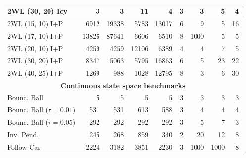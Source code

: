{\begin{tabular}{|l|rrrr|rrrr|}
\hline
2WL (30, 20) Icy & 3 & 3 & 11 & 4 & 3 & 3 & 5 & 4 \\
\hline
2WL (15, 10) I+P & 6912 & 19338 & 5783 & 13017 & 6 & 9 & 5 & 16 \\
2WL (17, 10) I+P & 13826 & 87641 & 6606 & 6510 & 8 & 1000 & 5 & 5 \\
2WL (20, 10) I+P & 4259 & 4259 & 12106 & 6389 & 4 & 4 & 7 & 5 \\
2WL (30, 20) I+P & 8347 & 5063 & 5795 & 16863 & 6 & 5 & 23 & 22 \\
2WL (40, 25) I+P & 1269 & 988 & 1028 & 12795 & 8 & 3 & 6 & 30 \\
\hline
\multicolumn{9}{|c|}{\textbf{Continuous state space benchmarks}}\\\hline
Bounc. Ball & 5 & 5 & 5 & 5 & 3 & 3 & 3 & 3 \\
Bounc. Ball ($\tau=0.01$) & 531 & 531 & 613 & 588 & 3 & 4 & 4 & 4 \\
Bounc. Ball ($\tau=0.05$) & 292 & 292 & 292 & 292 & 3 & 5 & 7 & 3 \\
\hline
Inv. Pend. & 245 & 268 & 859 & 340 & 2 & 20 & 12 & 8 \\
\hline
Follow Car & 2224 & 3182 & 3851 & 2230 & 3 & 1000 & 1000 & 8 \\
\hline
\end{tabular}}
